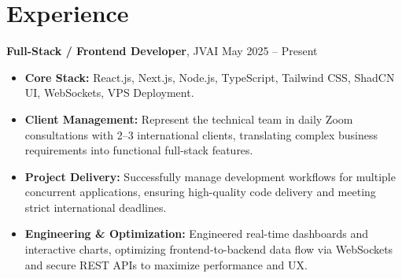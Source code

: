 \documentclass[a4paper,10pt]{article}
\begin{document}
\section*{Experience}
\vspace{2mm}
\textbf{Full-Stack / Frontend Developer}, JVAI \hfill May 2025 -- Present

\begin{itemize}
    \item \textbf{Core Stack:} React.js, Next.js, Node.js, TypeScript, Tailwind CSS, ShadCN UI, WebSockets, VPS Deployment.
    \item \textbf{Client Management:} Represent the technical team in daily Zoom consultations with 2--3 international clients, translating complex business requirements into functional full-stack features.
    \item \textbf{Project Delivery:} Successfully manage development workflows for multiple concurrent applications, ensuring high-quality code delivery and meeting strict international deadlines.
    \item \textbf{Engineering \& Optimization:} Engineered real-time dashboards and interactive charts, optimizing frontend-to-backend data flow via WebSockets and secure REST APIs to maximize performance and UX.
\end{itemize}

\end{document}
